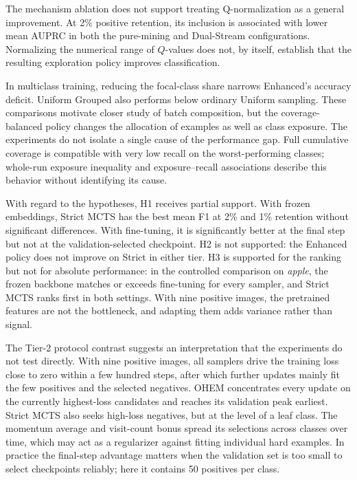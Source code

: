 \documentclass[11pt]{article}
\begin{document}
The mechanism ablation does not support treating Q-normalization as a general improvement. At 2\% positive retention, its inclusion is associated with lower mean AUPRC in both the pure-mining and Dual-Stream configurations. Normalizing the numerical range of $Q$-values does not, by itself, establish that the resulting exploration policy improves classification.

In multiclass training, reducing the focal-class share narrows Enhanced's accuracy deficit. Uniform Grouped also performs below ordinary Uniform sampling. These comparisons motivate closer study of batch composition, but the coverage-balanced policy changes the allocation of examples as well as class exposure. The experiments do not isolate a single cause of the performance gap. Full cumulative coverage is compatible with very low recall on the worst-performing classes; whole-run exposure inequality and exposure--recall associations describe this behavior without identifying its cause.

With regard to the hypotheses, H1 receives partial support. With frozen embeddings, Strict MCTS has the best mean F1 at 2\% and 1\% retention without significant differences. With fine-tuning, it is significantly better at the final step but not at the validation-selected checkpoint. H2 is not supported: the Enhanced policy does not improve on Strict in either tier. H3 is supported for the ranking but not for absolute performance: in the controlled comparison on \textit{apple}, the frozen backbone matches or exceeds fine-tuning for every sampler, and Strict MCTS ranks first in both settings. With nine positive images, the pretrained features are not the bottleneck, and adapting them adds variance rather than signal.

The Tier-2 protocol contrast suggests an interpretation that the experiments do not test directly. With nine positive images, all samplers drive the training loss close to zero within a few hundred steps, after which further updates mainly fit the few positives and the selected negatives. OHEM concentrates every update on the currently highest-loss candidates and reaches its validation peak earliest. Strict MCTS also seeks high-loss negatives, but at the level of a leaf class. The momentum average and visit-count bonus spread its selections across classes over time, which may act as a regularizer against fitting individual hard examples. In practice the final-step advantage matters when the validation set is too small to select checkpoints reliably; here it contains 50 positives per class.
\end{document}
